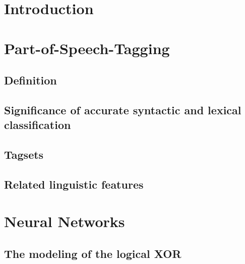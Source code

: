 \documentclass[12pt]{article}
\begin{document}
\newpage
\tableofcontents

\newpage


    

\section{Introduction}
\label{intro}

\newpage



\section{Part-of-Speech-Tagging}

\subsection{Definition}
\label{pos_def}


\subsection{Significance of accurate syntactic and lexical classification}
\label{pos_sig}


\subsection{Tagsets}
\label{pos_tagsets}


\subsection{Related linguistic features}
\label{pos_features}



\section{Neural Networks}

\subsection{The modeling of the logical XOR}
\label{nn_xor}

\end{document}
